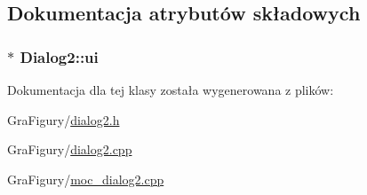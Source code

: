 \subsection{Dokumentacja atrybutów składowych}
\hypertarget{classDialog2_a321aadfcfc152fc97dc63391f08216fa}{
\subsubsection[{ui}]{$\ast$ Dialog2\-::ui\hspace{0.3cm}{\ttfamily [private]}}}\label{classDialog2_a321aadfcfc152fc97dc63391f08216fa}


Dokumentacja dla tej klasy została wygenerowana z plików\-:\begin{DoxyCompactItemize}
\item 
Gra\-Figury/\hyperlink{dialog2_8h}{dialog2.\-h}\item 
Gra\-Figury/\hyperlink{dialog2_8cpp}{dialog2.\-cpp}\item 
Gra\-Figury/\hyperlink{moc__dialog2_8cpp}{moc\-\_\-dialog2.\-cpp}\end{DoxyCompactItemize}
